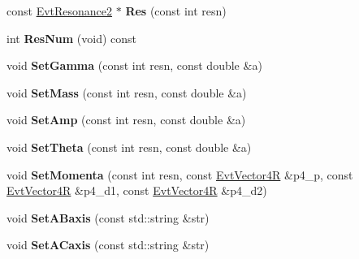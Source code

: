 \begin{DoxyCompactItemize}
\item 
\hypertarget{class_dalitz_model_ab2f5008f4ff7911b77ac9b82328bc1d5}{}const \hyperlink{class_evt_resonance2}{Evt\+Resonance2} $\ast$ {\bfseries Res} (const int resn)\label{class_dalitz_model_ab2f5008f4ff7911b77ac9b82328bc1d5}

\item 
\hypertarget{class_dalitz_model_aae9b1d77cb2a18bd2177f0342c71ffb3}{}int {\bfseries Res\+Num} (void) const \label{class_dalitz_model_aae9b1d77cb2a18bd2177f0342c71ffb3}

\item 
\hypertarget{class_dalitz_model_af7d88c17a654ba4a7acdd22349655fd2}{}void {\bfseries Set\+Gamma} (const int resn, const double \&a)\label{class_dalitz_model_af7d88c17a654ba4a7acdd22349655fd2}

\item 
\hypertarget{class_dalitz_model_a6d919b0d08a008979e2c6e6a5745401e}{}void {\bfseries Set\+Mass} (const int resn, const double \&a)\label{class_dalitz_model_a6d919b0d08a008979e2c6e6a5745401e}

\item 
\hypertarget{class_dalitz_model_a5d412d314d55577160c8e36008c8f6e2}{}void {\bfseries Set\+Amp} (const int resn, const double \&a)\label{class_dalitz_model_a5d412d314d55577160c8e36008c8f6e2}

\item 
\hypertarget{class_dalitz_model_addac0f1039f06562a284dd6522ca1de2}{}void {\bfseries Set\+Theta} (const int resn, const double \&a)\label{class_dalitz_model_addac0f1039f06562a284dd6522ca1de2}

\item 
\hypertarget{class_dalitz_model_af464574bf4c8d497d545a4bb2ef98507}{}void {\bfseries Set\+Momenta} (const int resn, const \hyperlink{class_evt_vector4_r}{Evt\+Vector4\+R} \&p4\+\_\+p, const \hyperlink{class_evt_vector4_r}{Evt\+Vector4\+R} \&p4\+\_\+d1, const \hyperlink{class_evt_vector4_r}{Evt\+Vector4\+R} \&p4\+\_\+d2)\label{class_dalitz_model_af464574bf4c8d497d545a4bb2ef98507}

\item 
\hypertarget{class_dalitz_model_acf488eef85585418cb07f044b3fecb1e}{}void {\bfseries Set\+A\+Baxis} (const std\+::string \&str)\label{class_dalitz_model_acf488eef85585418cb07f044b3fecb1e}

\item 
\hypertarget{class_dalitz_model_a4559453606e71306228acce2ef0de62a}{}void {\bfseries Set\+A\+Caxis} (const std\+::string \&str)\label{class_dalitz_model_a4559453606e71306228acce2ef0de62a}


\end{DoxyCompactItemize}
